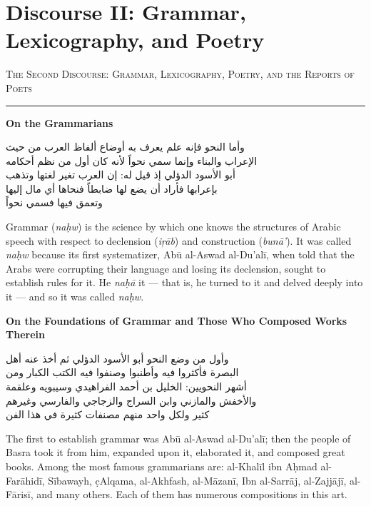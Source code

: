 \documentclass[11pt,a4paper]{article}
\newcommand{\ar}[1]{{\arabicfont\beginR #1\endR}}
\newcommand{\bilingual}[2]{%
  \noindent
  \begin{minipage}[t]{0.47\textwidth}
    \vspace{0pt}
    \begin{flushright}
    {\arabicfont\beginR #1\endR}
    \end{flushright}
  \end{minipage}%
  \hfill\vline\hfill
  \begin{minipage}[t]{0.47\textwidth}
    \vspace{0pt}
    #2
  \end{minipage}%
  \par\vspace{0.8em}
}
\newcommand{\bilingualsection}[2]{%
  \vspace{1em}%
  \noindent
  \begin{minipage}[t]{0.47\textwidth}
    \begin{flushright}
    \textsc{\color{sectioncolor}\ar{#1}}
    \end{flushright}
  \end{minipage}%
  \hfill
  \begin{minipage}[t]{0.47\textwidth}
    \textsc{\color{sectioncolor}#2}
  \end{minipage}%
  \par\vspace{0.5em}\hrule\vspace{0.8em}%
}
\newcommand{\bilingualsubsection}[2]{%
  \vspace{0.6em}%
  \noindent
  \begin{minipage}[t]{0.47\textwidth}
    \begin{flushright}
    \textbf{\color{sectioncolor}\ar{#1}}
    \end{flushright}
  \end{minipage}%
  \hfill
  \begin{minipage}[t]{0.47\textwidth}
    \textbf{\color{sectioncolor}#2}
  \end{minipage}%
  \par\vspace{0.4em}%
}
\begin{document}
\newpage

\section{Discourse II: Grammar, Lexicography, and Poetry}
\label{sec:II}

\bilingualsection{الفن الثاني في النحو واللغة والشعر وأخبار الشعراء}{The Second Discourse: Grammar, Lexicography, Poetry, and the Reports of Poets}

\bilingualsubsection{في النحويين}{On the Grammarians}

\bilingual
{وأما النحو فإنه علم يعرف به أوضاع ألفاظ العرب من حيث\\
الإعراب والبناء وإنما سمي نحواً لأنه كان أول من نظم أحكامه\\
أبو الأسود الدؤلي إذ قيل له: إن العرب تغير لغتها وتذهب\\
بإعرابها فأراد أن يضع لها ضابطاً فنحاها أي مال إليها\\
وتعمق فيها فسمي نحواً}
{Grammar (\textit{na\d{hw}}) is the science by which one knows the
structures of Arabic speech with respect to declension (\textit{i\c{r}\=ab})
and construction (\textit{bun\=a'}). It was called \textit{na\d{hw}}
because its first systematizer, Ab\=u al-Aswad al-Du'al\=i, when told that
the Arabs were corrupting their language and losing its declension, sought
to establish rules for it. He \textit{na\d{h}\=a} it — that is, he turned
to it and delved deeply into it — and so it was called \textit{na\d{hw}}.}

\bilingualsubsection{في أصول النحو والمصنفين فيه}{On the Foundations of Grammar and Those Who Composed Works Therein}

\bilingual
{وأول من وضع النحو أبو الأسود الدؤلي ثم أخذ عنه أهل\\
البصرة فأكثروا فيه وأطنبوا وصنفوا فيه الكتب الكبار ومن\\
أشهر النحويين: الخليل بن أحمد الفراهيدي وسيبويه وعلقمة\\
والأخفش والمازني وابن السراج والزجاجي والفارسي وغيرهم\\
كثير ولكل واحد منهم مصنفات كثيرة في هذا الفن}
{The first to establish grammar was Ab\=u al-Aswad al-Du'al\=i; then the
people of Basra took it from him, expanded upon it, elaborated it, and
composed great books. Among the most famous grammarians are: al-Khal\=il
ibn A\d{h}mad al-Far\=ahid\=i, S\=ibawayh, \d{c}Alqama, al-Akhfash,
al-M\=azan\=i, Ibn al-Sarr\=aj, al-Zajj\=aj\=i, al-F\=aris\=i, and many
others. Each of them has numerous compositions in this art.}
\end{document}

